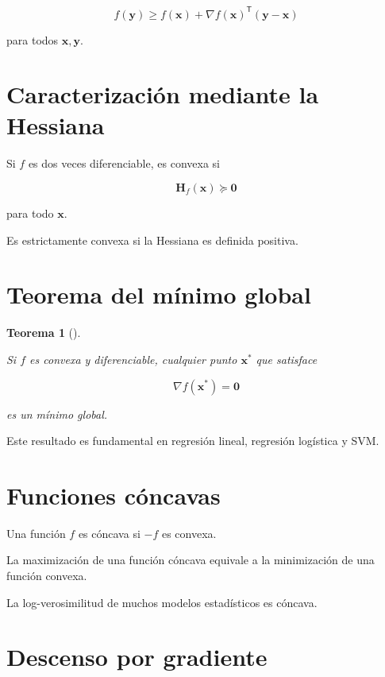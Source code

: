 \documentclass[
  spanish,
  11pt,
  letterpaper,
  DIV=11,
  numbers=noendperiod]{scrreprt}
\theoremstyle{definition}
\theoremstyle{plain}
\newtheorem{theorem}{Teorema}[chapter]
\theoremstyle{definition}
\theoremstyle{remark}
\begin{document}
\[
f(\mathbf{y})
\geq
f(\mathbf{x})
+
\nabla f(\mathbf{x})^{\mathsf T}
(\mathbf{y}-\mathbf{x})
\]

para todos \(\mathbf{x},\mathbf{y}\).

\section{Caracterización mediante la
Hessiana}\label{caracterizaciuxf3n-mediante-la-hessiana}

Si \(f\) es dos veces diferenciable, es convexa si

\[
\mathbf{H}_f(\mathbf{x})
\succeq
\mathbf{0}
\]

para todo \(\mathbf{x}\).

Es estrictamente convexa si la Hessiana es definida positiva.

\section{Teorema del mínimo global}\label{teorema-del-muxednimo-global}

\begin{theorem}[]\protect\hypertarget{thm-minimo-global-convexo}{}\label{thm-minimo-global-convexo}

Si \(f\) es convexa y diferenciable, cualquier punto \(\mathbf{x}^{*}\)
que satisface

\[
\nabla f(\mathbf{x}^{*})=\mathbf{0}
\]

es un mínimo global.

\end{theorem}

Este resultado es fundamental en regresión lineal, regresión logística y
SVM.

\section{Funciones cóncavas}\label{funciones-cuxf3ncavas}

Una función \(f\) es cóncava si \(-f\) es convexa.

La maximización de una función cóncava equivale a la minimización de una
función convexa.

La log-verosimilitud de muchos modelos estadísticos es cóncava.

\section{Descenso por gradiente}\label{descenso-por-gradiente}
\end{document}
